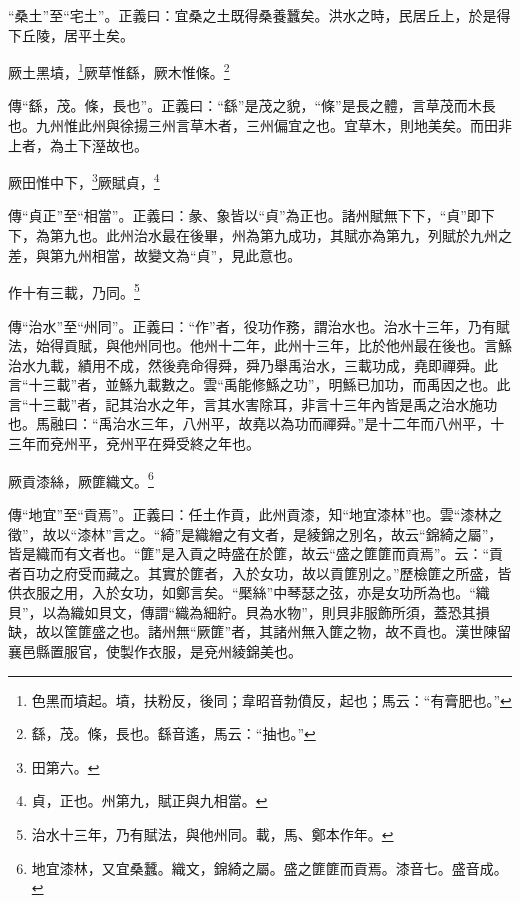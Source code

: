 {\noindent\shu{}\fzkt “桑土”至“宅土”。正義曰：宜桑之土既得桑養蠶矣。洪水之時，民居丘上，於是得下丘陵，居平土矣。 \par}

厥土黑墳，\footnote{色黑而墳起。墳，扶粉反，後同；韋昭音勃僨反，起也；馬云：“有膏肥也。”}厥草惟繇，厥木惟條。\footnote{繇，茂。條，長也。繇音遙，馬云：“抽也。”}

{\noindent\zhuan{}\fzbyks 傳“繇，茂。條，長也”。正義曰：“繇”是茂之貌，“條”是長之體，言草茂而木長也。九州惟此州與徐揚三州言草木者，三州偏宜之也。宜草木，則地美矣。而田非上者，為土下溼故也。 \par}

厥田惟中下，\footnote{田第六。}厥賦貞，\footnote{貞，正也。州第九，賦正與九相當。}

{\noindent\zhuan{}\fzbyks 傳“貞正”至“相當”。正義曰：彖、象皆以“貞”為正也。諸州賦無下下，“貞”即下下，為第九也。此州治水最在後畢，州為第九成功，其賦亦為第九，列賦於九州之差，與第九州相當，故變文為“貞”，見此意也。 \par}

作十有三載，乃同。\footnote{治水十三年，乃有賦法，與他州同。載，馬、鄭本作年。}

{\noindent\zhuan{}\fzbyks 傳“治水”至“州同”。正義曰：“作”者，役功作務，謂治水也。治水十三年，乃有賦法，始得貢賦，與他州同也。他州十二年，此州十三年，比於他州最在後也。言鯀治水九載，績用不成，然後堯命得舜，舜乃舉禹治水，三載功成，堯即禪舜。此言“十三載”者，並鯀九載數之。雲“禹能修鯀之功”，明鯀已加功，而禹因之也。此言“十三載”者，記其治水之年，言其水害除耳，非言十三年內皆是禹之治水施功也。馬融曰：“禹治水三年，八州平，故堯以為功而禪舜。”是十二年而八州平，十三年而兗州平，兗州平在舜受終之年也。 \par}

厥貢漆絲，厥篚織文。\footnote{地宜漆林，又宜桑蠶。織文，錦綺之屬。盛之篚篚而貢焉。漆音七。盛音成。}

{\noindent\zhuan{}\fzbyks 傳“地宜”至“貢焉”。正義曰：任土作貢，此州貢漆，知“地宜漆林”也。雲“漆林之徵”，故以“漆林”言之。“綺”是織繒之有文者，是綾錦之別名，故云“錦綺之屬”，皆是織而有文者也。“篚”是入貢之時盛在於篚，故云“盛之篚篚而貢焉”。云：“貢者百功之府受而藏之。其實於篚者，入於女功，故以貢篚別之。”歷檢篚之所盛，皆供衣服之用，入於女功，如鄭言矣。“檿絲”中琴瑟之弦，亦是女功所為也。“織貝”，以為織如貝文，傳謂“織為細紵。貝為水物”，則貝非服飾所須，蓋恐其損缺，故以筐篚盛之也。諸州無“厥篚”者，其諸州無入篚之物，故不貢也。漢世陳留襄邑縣置服官，使製作衣服，是兗州綾錦美也。 \par}

